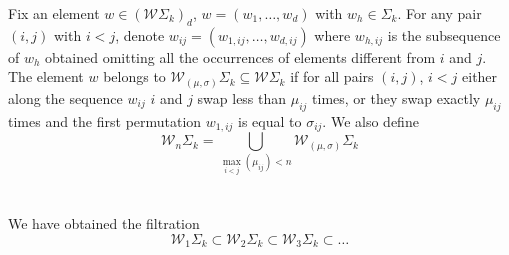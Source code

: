 	\begin{definition}
	Fix an element  $w\in (\mathcal{W}\Sigma_k)_{d}$, $w=(w_{1},\dots , w_{d})$ with $w_{h}\in \Sigma_k$. For any pair $(i,j)$ with $i< j$, denote $w_{ij}=(w_{1,ij},\dots , w_{d,ij})$ where $w_{h,ij}$ is the subsequence of $w_{h}$ obtained omitting all the occurrences of elements different from $i$ and $j$. 
	The element $w$ belongs to $\mathcal{W}_{(\mu,\sigma)}\Sigma_k\subseteq \mathcal{W}\Sigma_k$ if for all pairs $(i,j)$, $i< j$ either along the sequence $w_{ij}$ $i$ and $j$ swap less than $\mu_{ij}$ times,
	 or they swap exactly $\mu_{ij}$ times and the first permutation $w_{1,ij}$ is equal to $\sigma_{ij}$. We also define
	  \begin{equation*}
	 	\label{def}
	 	\mathcal{W}_{n}\Sigma_k=\bigcup_{\max_{i<j} (\mu_{ij})< n} \mathcal{W}_{(\mu,\sigma)}\Sigma_{k}
	 \end{equation*}
	\\
	\\
	We have obtained the filtration $$\mathcal{W}_1\Sigma_k \subset \mathcal{W}_2 \Sigma_k
	\subset \mathcal{W}_3 \Sigma_k
	\subset \dots $$ 
	
\end{definition}
 
